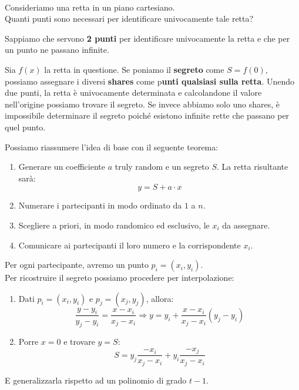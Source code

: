 \begin{example}\\
Consideriamo una retta in un piano cartesiano. \\Quanti punti sono necessari per identificare univocamente tale retta?
\begin{note}
Sappiamo che servono \textbf{2 punti} per identificare univocamente la retta e che per un punto ne passano infinite.
\end{note}
Sia $f(x)$ la retta in questione. Se poniamo il \textbf{segreto} come \textbf{$S=f(0)$}, possiamo assegnare i diversi \textbf{shares} come p\textbf{unti qualsiasi sulla retta}. Unendo due punti, la retta è univocamente determinata e calcolandone il valore nell'origine possiamo trovare il segreto. Se invece abbiamo solo uno shares, è impossibile determinare il segreto poiché esistono infinite rette che passano per quel punto.
\end{example}
Possiamo riassumere l'idea di base con il seguente teorema:
\begin{theorem}\label{thm:rectsecret}
\begin{enumerate}
\item Generare un coefficiente $a$ truly random e un segreto $S$. La retta risultante sarà: \[y=S+a\cdot x\]
    \item Numerare i partecipanti in modo ordinato da $1$ a $n$.
    \item Scegliere a priori, in modo randomico ed esclusivo, le $x_i$ da assegnare.
    \item Comunicare ai partecipanti il loro numero e la corrispondente $x_i$.
\end{enumerate}
Per ogni partecipante, avremo un punto $p_i=(x_i,y_i)$.\footnotemark\\
Per ricostruire il segreto possiamo procedere per interpolazione:
\begin{enumerate}
    \item Dati $p_i=(x_i,y_i)$ e $p_j=(x_j,y_j)$, allora:
    \[\frac{y-y_i}{y_j-y_i}=\frac{x-x_i}{x_j-x_i}\Longrightarrow y=y_i+\frac{x-x_i}{x_j-x_i}(y_j-y_i)\]
    \item Porre $x=0$ e trovare $y=S$:\footnotemark
    \[S=y_j\frac{-x_i}{x_j-x_i}+y_i\frac{-x_j}{x_j-x_i}\]
\end{enumerate}
\end{theorem}\pagebreak
E generalizzarla rispetto ad un polinomio di grado $t-1$.


